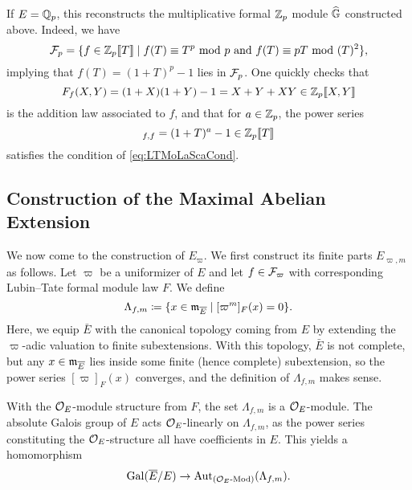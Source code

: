 \documentclass[../main.tex]{subfiles}
\begin{document}
\begin{xpl}
  If $E = \mathbb{Q}_p$, this reconstructs the multiplicative formal 
  $\mathbb{Z}_p$ module $\widehat{\mathbb{G}}$ constructed above. Indeed, we have 
  \begin{equation*}
    \mathcal{F}_p = \{f \in \mathbb{Z}_p\llbracket T \rrbracket \mid f(T) \equiv T^p \text{ mod } p
    \text{ and } f(T) \equiv pT \text{ mod } (T)^2 \},
  \end{equation*}
  implying that $f(T) = (1+T)^p-1$ lies in $\mathcal{F}_p$.  
  One quickly checks that 
  \begin{equation*}
    F_f(X,Y) = (1+X)(1+Y) - 1 = X + Y + XY \in \mathbb{Z}_p \llbracket X,Y \rrbracket
  \end{equation*}
  is the addition law associated to $f$, and that 
  for $a \in \mathbb{Z}_p$, the power series
  \begin{equation*}
    [a]_{f,f} = (1+T)^{a} - 1 \in \Z_p \llbr T \rrbr
  \end{equation*}
  satisfies the condition of \eqref{eq:LTMoLaScaCond}. 
\end{xpl}

\subsection{Construction of the Maximal Abelian Extension} %
\label{sub:Construction of the Maximal Abelian Extension}
We now come to the construction of $E_\varpi$. We first construct its
finite parts $E_{\varpi, m}$ as follows. Let $\varpi$ be a
uniformizer of $E$ and let $f \in \mathcal{F}_\varpi$ with corresponding
Lubin--Tate formal module law $F$. We define
\begin{equation*}
  \Lambda_{f,m} \coloneqq \{x \in \mathfrak{m}_{\overline E} \mid [\varpi^m]_F(x) = 0\}.
\end{equation*}
Here, we equip $\bar E$ with the canonical topology coming from $E$ by extending the
$\varpi$-adic valuation to finite subextensions. With this topology, $\bar E$
is not complete, but any $x \in \mathfrak{m}_{\overline E}$ lies inside some finite (hence
complete) subextension, so the power series $[\varpi]_F(x)$ converges, and the 
definition of $\Lambda_{f,m}$ makes sense.

With the $\mathcal{O}_E$-module structure from $F$, the set $\Lambda_{f,m}$ is a
$\mathcal{O}_E$-module. The absolute Galois group of $E$ acts $\mathcal{O}_E$-linearly on
$\Lambda_{f,m}$, as the power series constituting the $\mathcal{O}_E$-structure all
have coefficients in $E$. This yields a homomorphism 
\begin{equation} \label{eq:GaloisGroupToLambdaHom}
  \operatorname{Gal}(\overline E /E ) \to \operatorname{Aut}_{{({\mathcal{O}_E}\text-\allowbreak\mathrm{Mod})}}(\Lambda_{f,m}).
\end{equation}
\end{document}
